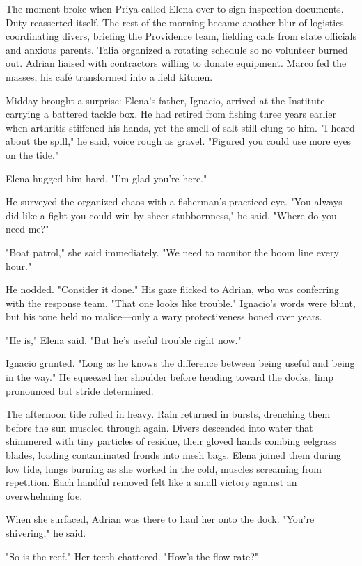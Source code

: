 The moment broke when Priya called Elena over to sign inspection documents. Duty reasserted itself. The rest of the morning became another blur of logistics—coordinating divers, briefing the Providence team, fielding calls from state officials and anxious parents. Talia organized a rotating schedule so no volunteer burned out. Adrian liaised with contractors willing to donate equipment. Marco fed the masses, his café transformed into a field kitchen.

Midday brought a surprise: Elena's father, Ignacio, arrived at the Institute carrying a battered tackle box. He had retired from fishing three years earlier when arthritis stiffened his hands, yet the smell of salt still clung to him. "I heard about the spill," he said, voice rough as gravel. "Figured you could use more eyes on the tide."

Elena hugged him hard. "I'm glad you're here."

He surveyed the organized chaos with a fisherman’s practiced eye. "You always did like a fight you could win by sheer stubbornness," he said. "Where do you need me?"

"Boat patrol," she said immediately. "We need to monitor the boom line every hour."

He nodded. "Consider it done." His gaze flicked to Adrian, who was conferring with the response team. "That one looks like trouble." Ignacio's words were blunt, but his tone held no malice—only a wary protectiveness honed over years.

"He is," Elena said. "But he's useful trouble right now."

Ignacio grunted. "Long as he knows the difference between being useful and being in the way." He squeezed her shoulder before heading toward the docks, limp pronounced but stride determined.

The afternoon tide rolled in heavy. Rain returned in bursts, drenching them before the sun muscled through again. Divers descended into water that shimmered with tiny particles of residue, their gloved hands combing eelgrass blades, loading contaminated fronds into mesh bags. Elena joined them during low tide, lungs burning as she worked in the cold, muscles screaming from repetition. Each handful removed felt like a small victory against an overwhelming foe.

When she surfaced, Adrian was there to haul her onto the dock. "You're shivering," he said.

"So is the reef." Her teeth chattered. "How's the flow rate?"

